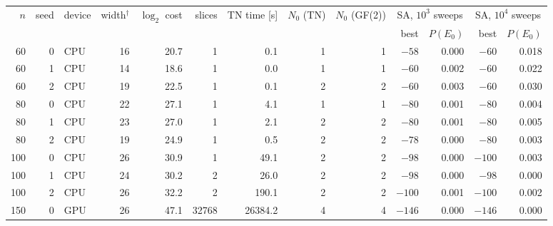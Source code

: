 \begin{tabular}{rrl rrr r rr rr rr}
\toprule
$n$ & seed & device & width$^\dagger$ & $\log_2$ cost & slices & TN time [s] & $N_0$ (TN) & $N_0$ (GF(2)) & \multicolumn{2}{c}{SA, $10^3$ sweeps} & \multicolumn{2}{c}{SA, $10^4$ sweeps} \\
& & & & & & & & & best & $P(E_0)$ & best & $P(E_0)$ \\
\midrule
60 & 0 & CPU & 16 & 20.7 & 1 & 0.1 & 1 & 1 & $-58$ & 0.000 & $-60$ & 0.018 \\
60 & 1 & CPU & 14 & 18.6 & 1 & 0.0 & 1 & 1 & $-60$ & 0.002 & $-60$ & 0.022 \\
60 & 2 & CPU & 19 & 22.5 & 1 & 0.1 & 2 & 2 & $-60$ & 0.003 & $-60$ & 0.030 \\
80 & 0 & CPU & 22 & 27.1 & 1 & 4.1 & 1 & 1 & $-80$ & 0.001 & $-80$ & 0.004 \\
80 & 1 & CPU & 23 & 27.0 & 1 & 2.1 & 2 & 2 & $-80$ & 0.001 & $-80$ & 0.005 \\
80 & 2 & CPU & 19 & 24.9 & 1 & 0.5 & 2 & 2 & $-78$ & 0.000 & $-80$ & 0.003 \\
100 & 0 & CPU & 26 & 30.9 & 1 & 49.1 & 2 & 2 & $-98$ & 0.000 & $-100$ & 0.003 \\
100 & 1 & CPU & 24 & 30.2 & 2 & 26.0 & 2 & 2 & $-98$ & 0.000 & $-98$ & 0.000 \\
100 & 2 & CPU & 26 & 32.2 & 2 & 190.1 & 2 & 2 & $-100$ & 0.001 & $-100$ & 0.002 \\
150 & 0 & GPU & 26 & 47.1 & 32768 & 26384.2 & 4 & 4 & $-146$ & 0.000 & $-146$ & 0.000 \\
\bottomrule
\end{tabular}